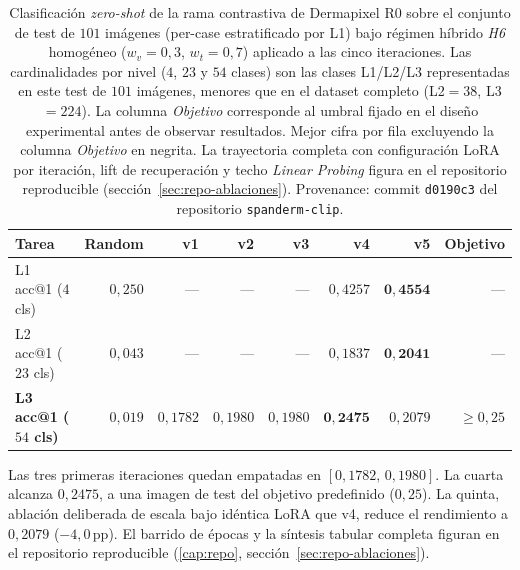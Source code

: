 \begin{table}[htbp]
\centering
\footnotesize
\setlength{\tabcolsep}{3pt}
\renewcommand{\arraystretch}{0.95}
\caption{Clasificación \emph{zero-shot} de la rama contrastiva de
Dermapixel R0 sobre el
conjunto de test de $101$ imágenes (per-case estratificado por
L1) bajo régimen híbrido \emph{H6} homogéneo
($w_v = 0{,}3$, $w_t = 0{,}7$) aplicado a las cinco iteraciones.
Las cardinalidades por nivel ($4$, $23$ y $54$ clases) son las clases
L1/L2/L3 representadas en este test de $101$ imágenes, menores que en
el dataset completo (L2$=38$, L3$=224$).
La columna \emph{Objetivo} corresponde al umbral fijado en el
diseño experimental antes de observar resultados. Mejor cifra
por fila excluyendo la columna \emph{Objetivo} en negrita.
La trayectoria completa con configuración LoRA por iteración,
lift de recuperación y techo \emph{Linear Probing} figura en el
repositorio reproducible (sección~\ref{sec:repo-ablaciones}).
Provenance: commit \texttt{d0190c3} del repositorio
\texttt{spanderm-clip}.}
\label{tab:spanderm-zs}
\begin{tabular}{lrrrrrrr}
\hline
Tarea                        & Random    & v1                  & v2                  & v3                  & v4                  & v5                  & Objetivo \\
\hline
L1 acc@1 ($4$ cls)            & $0{,}250$ & ---                 & ---                 & ---                 & $0{,}4257$          & $\mathbf{0{,}4554}$ & ---           \\
L2 acc@1 ($23$ cls)           & $0{,}043$ & ---                 & ---                 & ---                 & $0{,}1837$          & $\mathbf{0{,}2041}$ & ---           \\
\textbf{L3 acc@1 ($54$ cls)}  & $0{,}019$ & $0{,}1782$          & $0{,}1980$          & $0{,}1980$          & $\mathbf{0{,}2475}$ & $0{,}2079$          & $\geq 0{,}25$ \\
\hline
\end{tabular}
\end{table}

Las tres primeras iteraciones quedan empatadas en
$[0{,}1782,\,0{,}1980]$. La cuarta alcanza $0{,}2475$, a una imagen de
test del objetivo predefinido ($0{,}25$). La quinta, ablación
deliberada de escala bajo idéntica LoRA que v4, reduce el rendimiento a
$0{,}2079$ ($-4{,}0$\,pp). El barrido de épocas y la síntesis tabular
completa figuran en el repositorio reproducible (\ref{cap:repo},
sección~\ref{sec:repo-ablaciones}).


